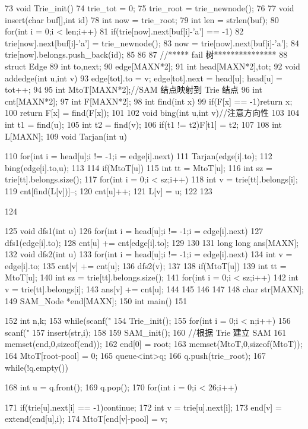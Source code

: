 \documentclass[11pt]{article}
\begin{document}
\begin{Code}
 73   void Trie_init(){
 74       trie_tot = 0;
 75       trie_root = trie_newnode();
 76   }
 77   void insert(char buf[],int id){
 78       int now = trie_root;
 79       int len = strlen(buf);
 80       for(int i = 0;i < len;i++){
 81           if(trie[now].next[buf[i]-'a'] == -1)
 82                trie[now].next[buf[i]-'a'] = trie_newnode();
 83           now = trie[now].next[buf[i]-'a'];
 84           trie[now].belongs.push_back(id);
 85       }
 86   }
 87   //***** fail 树***************
 88   struct Edge{
 89       int to,next;
 90   }edge[MAXN*2];
 91   int head[MAXN*2],tot;
 92   void addedge(int u,int v){
 93       edge[tot].to = v; edge[tot].next = head[u]; head[u] = tot++;
 94   }
 95   int MtoT[MAXN*2];//SAM 结点映射到 Trie 结点
 96   int cnt[MAXN*2];
 97   int F[MAXN*2];
 98   int find(int x){
 99       if(F[x] == -1)return x;
100       return F[x] = find(F[x]);
101   }
102   void bing(int u,int v)//注意方向性
103   {
104       int t1 = find(u);
105       int t2 = find(v);
106       if(t1 != t2)F[t1] = t2;
107   }
108   int L[MAXN];
109   void Tarjan(int u){
110       for(int i = head[u];i != -1;i = edge[i].next){
111           Tarjan(edge[i].to);
112           bing(edge[i].to,u);
113       }
114       if(MtoT[u]){
115           int tt = MtoT[u];
116           int sz = trie[tt].belongs.size();
117           for(int i = 0;i < sz;i++){
118                int v = trie[tt].belongs[i];
119                cnt[find(L[v])]--;
120                cnt[u]++;
121                L[v] = u;
122           }
123       }


124   }
125   void dfs1(int u){
126       for(int i = head[u];i != -1;i = edge[i].next){
127           dfs1(edge[i].to);
128           cnt[u] += cnt[edge[i].to];
129       }
130   }
131   long long ans[MAXN];
132   void dfs2(int u){
133       for(int i = head[u];i != -1;i = edge[i].next){
134           int v = edge[i].to;
135           cnt[v] += cnt[u];
136           dfs2(v);
137       }
138       if(MtoT[u]){
139           int tt = MtoT[u];
140           int sz = trie[tt].belongs.size();
141           for(int i = 0;i < sz;i++){
142               int v = trie[tt].belongs[i];
143               ans[v] += cnt[u];
144           }
145       }
146   }
147
148   char str[MAXN];
149   SAM_Node *end[MAXN];
150   int main()
151   {
152       int n,k;
153       while(scanf("%
154           Trie_init();
155           for(int i = 0;i < n;i++){
156                scanf("%
157                insert(str,i);
158           }
159           SAM_init();
160           //根据 Trie 建立 SAM
161           memset(end,0,sizeof(end));
162           end[0] = root;
163           memset(MtoT,0,sizeof(MtoT));
164           MtoT[root-pool] = 0;
165           queue<int>q;
166           q.push(trie_root);
167           while(!q.empty()){
168                int u = q.front();
169                q.pop();
170                for(int i = 0;i < 26;i++){
171                    if(trie[u].next[i] == -1)continue;
172                    int v = trie[u].next[i];
173                    end[v] = extend(end[u],i);
174                    MtoT[end[v]-pool] = v;


}}}
\end{Code}
\end{document}
